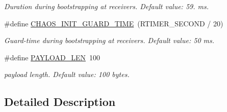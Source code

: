 \begin{DoxyCompactItemize}
\begin{DoxyCompactList}\small\item\em Duration during bootstrapping at receivers. Default value\-: 59. ms. \end{DoxyCompactList}\item 
\hypertarget{group__chaos-test-settings_ga1f0aaac6ffeb7477d0718d1cfacdf4a1}{\#define \hyperlink{group__chaos-test-settings_ga1f0aaac6ffeb7477d0718d1cfacdf4a1}{C\-H\-A\-O\-S\-\_\-\-I\-N\-I\-T\-\_\-\-G\-U\-A\-R\-D\-\_\-\-T\-I\-M\-E}~(R\-T\-I\-M\-E\-R\-\_\-\-S\-E\-C\-O\-N\-D / 20)}\label{group__chaos-test-settings_ga1f0aaac6ffeb7477d0718d1cfacdf4a1}

\begin{DoxyCompactList}\small\item\em Guard-\/time during bootstrapping at receivers. Default value\-: 50 ms. \end{DoxyCompactList}\item 
\hypertarget{group__chaos-test-settings_ga212a14606599edd2c69298c5cffa64a0}{\#define \hyperlink{group__chaos-test-settings_ga212a14606599edd2c69298c5cffa64a0}{P\-A\-Y\-L\-O\-A\-D\-\_\-\-L\-E\-N}~100}\label{group__chaos-test-settings_ga212a14606599edd2c69298c5cffa64a0}

\begin{DoxyCompactList}\small\item\em payload length. Default value\-: 100 bytes. \end{DoxyCompactList}\end{DoxyCompactItemize}


\subsection{Detailed Description}
